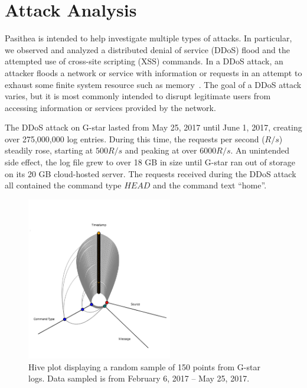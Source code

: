 
\section{Attack Analysis} \label{analysis}

Pasithea is intended to help investigate multiple types of attacks.
In particular, we observed and analyzed a distributed denial of service (DDoS) flood and the attempted use of cross-site scripting (XSS) commands.
In a DDoS attack, an attacker floods a network or service with information or requests in an attempt to exhaust some finite system resource such as memory~\cite{DoS-Def}. 
The goal of a DDoS attack varies, but it is most commonly intended to disrupt legitimate users from accessing information or services provided by the network.

The DDoS attack on G-star lasted from May 25, 2017 until June 1, 2017, creating over 275,000,000 log entries. 
During this time, the requests per second ($R/s$) steadily rose, starting at $500 R/s$ and peaking at over $6000 R/s$. 
An unintended side effect, the log file grew to over 18 GB in size until G-star ran out of storage on its 20 GB cloud-hosted server.
The requests received during the DDoS attack all contained the command type $HEAD$ and the command text ``home''.

\begin{figure}[b]
   \centering
   \includegraphics[width=2.5in]{images/regHive.png} 
   \caption{Hive plot displaying a random sample of 150 points from G-star logs. Data sampled is from February 6, 2017 -- May 25, 2017.}
   \label{fig:regHive}
\end{figure}

